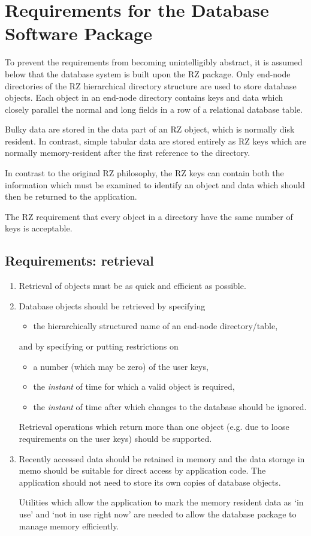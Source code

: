 \section{Requirements for the Database Software Package}
To prevent the requirements from becoming unintelligibly abstract, it is
assumed below that the database system is built upon the RZ package.  Only end-node
directories of the RZ hierarchical directory structure are used to store database
objects.  Each object in an end-node directory contains keys and data which closely
parallel the normal and long fields in a row of a relational database table.

Bulky data are stored in the data part of an RZ object, which is normally disk
resident.  In contrast, simple tabular data are stored entirely as RZ keys which
are normally memory-resident after the first reference to the directory.

In contrast to the original RZ philosophy, the RZ keys can contain both the
information which must be examined to identify an object and data which should
then be returned to the application.

The RZ requirement that every object in a directory have the same number of
keys is acceptable.

\subsection{Requirements: retrieval}
\begin{enumerate}
\item
Retrieval of objects must be as quick and efficient as
possible.
\item
Database objects should be retrieved by specifying
\begin{itemize}
\item
the hierarchically structured name of an end-node directory/table,
\end{itemize}
and by specifying or putting restrictions on
\begin{itemize}
\item
a number (which may be zero) of the user keys,
\item
the {\it instant} of time for which a valid object is required,
\item
the {\it instant} of time after which changes to the database should be ignored.
\end{itemize}
Retrieval operations which return more than one object (e.g. due to loose
requirements on the user keys) should be supported.

\item
Recently accessed data should be retained in memory and the data storage in memo
should be suitable for direct access by application code.  The application should
not need to store its own copies of database objects.

Utilities which allow the application to mark the memory resident data as
`in use'
and `not in use right now' are needed to allow the database package to manage
memory efficiently.
\end{enumerate}

